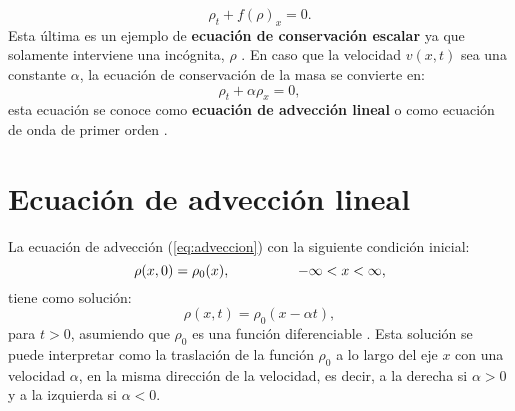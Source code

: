 \begin{equation}
	\rho_t + f(\rho)_x = 0.
\end{equation}
Esta última es un ejemplo de \textbf{ecuación de conservación escalar} \cite{Leveque} ya que solamente interviene una incógnita, $\rho$ \cite{Leveque}.
En caso que la velocidad $v(x,t)$ sea una constante $\alpha$, la ecuación de conservación de la masa se convierte en:
\begin{equation}
	\rho_t + \alpha\rho_x = 0,
	\label{eq:adveccion}
\end{equation}
esta ecuación se conoce como \textbf{ecuación de advección lineal} \cite{Leveque} o como ecuación de onda de primer orden \cite{heattransfer}.
\section{Ecuación de advección lineal}
La ecuación de advección (\ref{eq:adveccion}) con la siguiente condición inicial:
\begin{equation}
	\rho(x,0) = \rho_0(x), \hspace{1.7cm} -\infty < x < \infty,
\end{equation}
tiene como solución:
\begin{equation}
	\rho(x,t) = \rho_0(x - \alpha t),
	\label{eq:sol-advec}
\end{equation}
para $t> 0$, asumiendo que $\rho_0$ es una función diferenciable \cite{Leveque}. Esta solución se puede interpretar como la traslación de la función $\rho_0$ a lo largo del eje $x$ con una velocidad $\alpha$, en la misma dirección de la velocidad, es decir, a la derecha si $\alpha > 0$ y a la izquierda si $\alpha < 0$.
